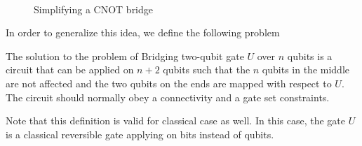 \begin{figure}[ht]
  \centering
   \\

  \caption{Simplifying a CNOT bridge}
  \label{ex:cnot-bridge-decomposition}
\end{figure}

In order to generalize this idea, we define the following problem

\begin{problem}
  The solution to the problem of Bridging two-qubit gate $U$ over $n$ qubits is a circuit that can be applied on $n + 2$ qubits such that the $n$ qubits in the middle are not affected and the two qubits on the ends are mapped with respect to $U$. The circuit should normally obey a connectivity and a gate set constraints.
\end{problem}

Note that this definition is valid for classical case as well. In this case, the gate $U$ is a classical reversible gate applying on bits instead of qubits.

